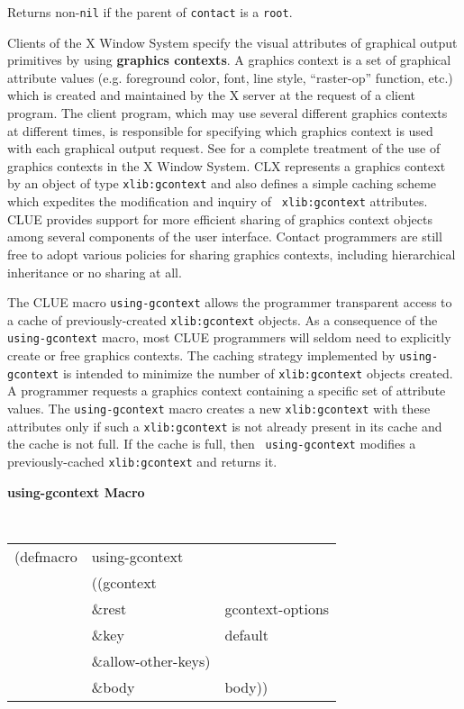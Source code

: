 \begin{flushright} \parbox[t]{6.125in}{
Returns non-{\tt nil} if the parent of {\tt contact} is a {\tt root}.

}\end{flushright}


Clients of the X Window System
specify the visual attributes of graphical output primitives by using
{\bf graphics contexts}.
A graphics context is a set of graphical attribute values (e.g.
foreground color, font, line style, ``raster-op'' function, etc.) which
is created and maintained by the X server at the request of a client
program. The client program, which may use several different graphics
contexts at different times, is responsible for specifying which
graphics context is used with each graphical output request. See
\cite{x-protocol} for a complete treatment of the use of graphics
contexts in the X Window System. CLX\cite{clx} represents a graphics context by an
object of type {\tt xlib:gcontext} and also defines a simple caching
scheme which expedites the modification and inquiry of {\tt
xlib:gcontext} attributes.
CLUE provides support for more efficient sharing of graphics context
objects among several components of the user interface.  Contact
programmers are still free to adopt various policies for sharing
graphics contexts, including hierarchical inheritance or no sharing at
all.

The CLUE macro {\tt using-gcontext} allows the programmer transparent
access to a cache of previously-created {\tt xlib:gcontext} objects. As
a consequence of the {\tt using-gcontext} macro, most CLUE programmers
will seldom need to explicitly create or free graphics contexts. 
The caching strategy implemented by {\tt using-gcontext} is intended to
minimize the number of {\tt xlib:gcontext} objects created. A programmer
requests a graphics context containing a specific set of attribute
values. The {\tt using-gcontext} macro creates a new {\tt xlib:gcontext}
with these attributes only if such a {\tt xlib:gcontext} is not already
present in its cache and the cache is not full. If the cache is full, then {\tt
using-gcontext} modifies a previously-cached {\tt xlib:gcontext} and returns
it.

{\samepage
{\large {\bf using-gcontext \hfill Macro}} 
\begin{flushright} \parbox[t]{6.125in}{
\tt
\begin{tabular}{lll}
\raggedright
(defmacro & using-gcontext & \\ 
& ((gcontext \\
& \&rest & gcontext-options\\ 
& \&key  & default \\
& \&allow-other-keys)\\
& \&body  &body))
\end{tabular}
\rm

}\end{flushright}}

